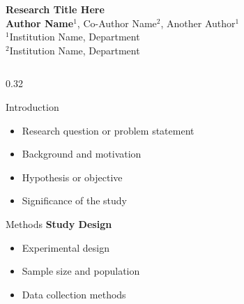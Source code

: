 \documentclass[final,t]{beamer}
\begin{document}
\begin{frame}[t]

\begin{center}
  \vspace{2em}
  \huge{\textbf{\textcolor{primary}{Research Title Here}}}\\[1.5em]
  \Large{\textbf{Author Name}$^1$, Co-Author Name$^2$, Another Author$^1$}\\[1em]
  \normalsize{$^1$Institution Name, Department}\\
  \normalsize{$^2$Institution Name, Department}\\[1em]

  \vspace{1em}

\end{center}

\vspace{2em}

\begin{columns}[t]

\begin{column}{0.32\paperwidth}

  \begin{block}{Introduction}
    \begin{itemize}
      \item Research question or problem statement
      \item Background and motivation
      \item Hypothesis or objective
      \item Significance of the study
    \end{itemize}
  \end{block}

  \vspace{1em}

  \begin{block}{Methods}
    \textbf{Study Design}
    \begin{itemize}
      \item Experimental design
      \item Sample size and population
      \item Data collection methods
    \end{itemize}

    \vspace{0.5em}


\end{block}
\end{column}
\end{columns}
\end{frame}
\end{document}
